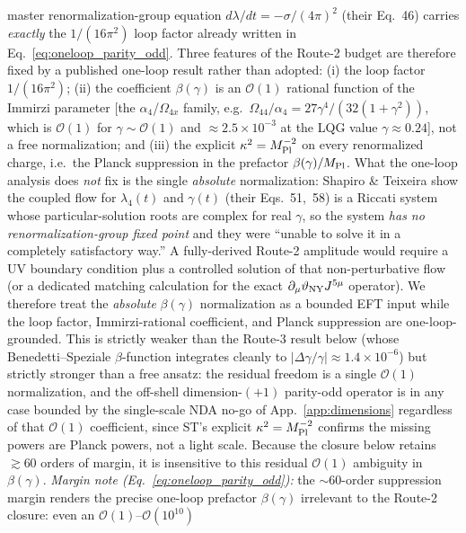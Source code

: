 \documentclass[aps,prd,twocolumn,superscriptaddress,showpacs,preprintnumbers,nofootinbib,longbibliography,floatfix]{revtex4-2}
\begin{document}
master renormalization-group equation $d\lambda/dt=-\sigma/(4\pi)^2$
(their Eq.~46) carries \emph{exactly} the $1/(16\pi^2)$ loop factor
already written in Eq.~\eqref{eq:oneloop_parity_odd}. Three features of
the Route-2 budget are therefore fixed by a published one-loop result
rather than adopted: (i) the loop factor $1/(16\pi^2)$; (ii) the
coefficient $\beta(\gamma)$ is an $\mathcal{O}(1)$ rational function of
the Immirzi parameter [the $\alpha_4$/$\Omega_{4x}$ family, e.g.\
$\Omega_{44}/\alpha_4=27\gamma^4/(32(1+\gamma^2))$, which is
$\mathcal{O}(1)$ for $\gamma\!\sim\!\mathcal{O}(1)$ and
${\approx}2.5\times10^{-3}$ at the LQG value $\gamma\!\approx\!0.24$],
not a free normalization; and (iii) the explicit
$\kappa^2=M_{\rm Pl}^{-2}$ on every renormalized charge, i.e.\ the
Planck suppression in the prefactor $\beta(\gamma)/M_{\rm Pl}$. What the
one-loop analysis does \emph{not} fix is the single \emph{absolute}
normalization: Shapiro \& Teixeira show the coupled flow for
$\lambda_4(t)$ and $\gamma(t)$ (their Eqs.~51,~58) is a Riccati system
whose particular-solution roots are complex for real $\gamma$, so the
system \emph{has no renormalization-group fixed point} and they were
``unable to solve it in a completely satisfactory way.'' A
fully-derived Route-2 amplitude would require a UV boundary condition
plus a controlled solution of that non-perturbative flow (or a
dedicated matching calculation for the exact
$\partial_\mu\vartheta_{\rm NY}J^{5\mu}$ operator). We therefore treat
the \emph{absolute} $\beta(\gamma)$ normalization as a bounded EFT input
while the loop factor, Immirzi-rational coefficient, and Planck
suppression are one-loop-grounded. This is strictly weaker than the
Route-3 result below (whose Benedetti--Speziale $\beta$-function
integrates cleanly to $|\Delta\gamma/\gamma|\approx1.4\times10^{-6}$)
but strictly stronger than a free ansatz: the residual freedom is a
single $\mathcal{O}(1)$ normalization, and the off-shell dimension-$(+1)$
parity-odd operator is in any case bounded by the single-scale NDA no-go
of App.~\ref{app:dimensions} regardless of that $\mathcal{O}(1)$
coefficient, since ST's explicit $\kappa^2=M_{\rm Pl}^{-2}$ confirms the
missing powers are Planck powers, not a light scale. Because the closure
below retains $\gtrsim 60$ orders of margin, it is insensitive to this
residual $\mathcal{O}(1)$ ambiguity in $\beta(\gamma)$.
\emph{Margin note (Eq.~\eqref{eq:oneloop_parity_odd}):} the ${\sim}60$-order
suppression margin renders the precise one-loop prefactor $\beta(\gamma)$
irrelevant to the Route-2 closure: even an $\mathcal{O}(1)$--$\mathcal{O}(10^{10})$
\end{document}

